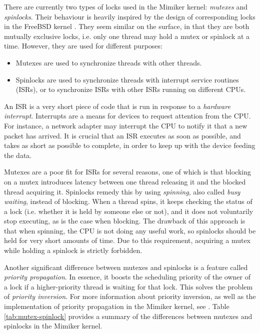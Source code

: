 \documentclass[shortabstract, manyadvisors, english, mgr]{iithesis}
\begin{document}
There are currently two types of locks used in the Mimiker kernel:
\textit{mutexes} and \textit{spinlocks}. Their behaviour is heavily inspired by
the design of corresponding locks in the FreeBSD kernel \cite{freebsd-locking}.
They seem similar on the surface, in that they are both mutually exclusive
locks, i.e. only one thread may hold a mutex or spinlock at a time. However,
they are used for different purposes:
\begin{itemize}
\item Mutexes are used to synchronize threads with other threads.
\item Spinlocks are used to synchronize threads with interrupt service routines
  (ISRs), or to synchronize ISRs with other ISRs running on different CPUs.
\end{itemize}
An ISR is a very short piece of code that is run in response to a
\textit{hardware interrupt}. Interrupts are a means for devices to request
attention from the CPU. For instance, a network adapter may interrupt the CPU to
notify it that a new packet has arrived. It is crucial that an ISR executes as
soon as possible, and takes as short as possible to complete, in order to keep
up with the device feeding the data.

Mutexes are a poor fit for ISRs for several reasons, one of which is that
blocking on a mutex introduces latency between one thread releasing it and the
blocked thread acquiring it. Spinlocks remedy this by using \textit{spinning},
also called \textit{busy waiting}, instead of blocking. When a thread spins, it
keeps checking the status of a lock (i.e. whether it is held by someone else or
not), and it does not voluntarily stop executing, as is the case when blocking.
The drawback of this approach is that when spinning, the CPU is not doing any
useful work, so spinlocks should be held for very short amounts of time. Due to
this requirement, acquiring a mutex while holding a spinlock is strictly forbidden.

Another significant difference between mutexes and spinlocks is a feature called
\textit{priority propagation}. In essence, it boosts the scheduling priority of
the owner of a lock if a higher-priority thread is waiting for that lock. This
solves the problem of \textit{priority inversion}. For more information about
priority inversion, as well as the implementation of priority propagation in the
Mimiker kernel, see \cite{julian-thesis}. Table \ref{tab:mutex-spinlock}
provides a summary of the differences between mutexes and spinlocks in the
Mimiker kernel.
\end{document}
